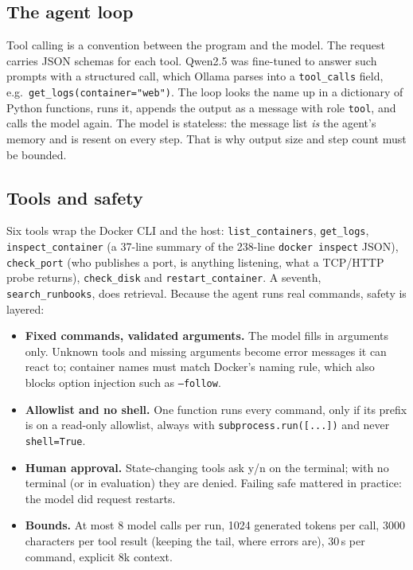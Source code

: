 \documentclass[10pt,a4paper]{article}
\newcommand{\code}[1]{\texttt{#1}}
\begin{document}
\vspace{-4pt}
\subsection{The agent loop}
Tool calling is a convention between the program and the model. The request carries JSON schemas
for each tool. Qwen2.5 was fine-tuned to answer such prompts with a structured call, which Ollama
parses into a \code{tool\_calls} field, e.g.\ \code{get\_logs(container="web")}. The loop looks
the name up in a dictionary of Python functions, runs it, appends the output as a message with role
\code{tool}, and calls the model again. The model is stateless: the message list \emph{is} the
agent's memory and is resent on every step. That is why output size and step count must be bounded.

\subsection{Tools and safety}
Six tools wrap the Docker CLI and the host: \code{list\_containers}, \code{get\_logs},
\code{inspect\_container} (a 37-line summary of the 238-line \code{docker inspect} JSON),
\code{check\_port} (who publishes a port, is anything listening, what a TCP/HTTP probe returns),
\code{check\_disk} and \code{restart\_container}. A seventh, \code{search\_runbooks}, does
retrieval. Because the agent runs real commands, safety is layered:
\begin{itemize}
\item \textbf{Fixed commands, validated arguments.} The model fills in arguments only. Unknown tools
  and missing arguments become error messages it can react to; container names must match Docker's
  naming rule, which also blocks option injection such as \code{--follow}.
\item \textbf{Allowlist and no shell.} One function runs every command, only if its prefix is on a
  read-only allowlist, always with \code{subprocess.run([...])} and never \code{shell=True}.
\item \textbf{Human approval.} State-changing tools ask y/n on the terminal; with no terminal (or in
  evaluation) they are denied. Failing safe mattered in practice: the model did request restarts.
\item \textbf{Bounds.} At most 8 model calls per run, 1024 generated tokens per call, 3000 characters
  per tool result (keeping the tail, where errors are), 30\,s per command, explicit 8k context.
\end{itemize}
\end{document}
